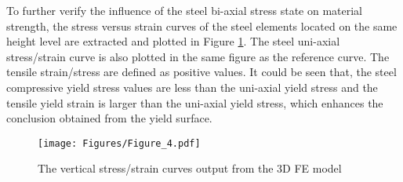\documentclass[12pt,a4]{article}
\begin{document}
	\par
	To further verify the influence of the steel bi-axial stress state on material strength, the stress versus strain curves of the steel elements located on the same height level are extracted and plotted in Figure \ref{fig:3}. The steel uni-axial stress/strain curve is also plotted in the same figure as the reference curve. The tensile strain/stress are defined as positive values. It could be seen that, the steel compressive yield stress values are less than the uni-axial yield stress and the tensile yield strain is larger than the uni-axial yield stress, which enhances the conclusion obtained from the yield surface.
	\par
	\begin{figure}[h]
		\centering
		\texttt{[image: Figures/Figure\_4.pdf]}
		\caption{The vertical stress/strain curves output from the 3D FE model}
		\label{fig:3}
	\end{figure}
	\par
\end{document}
